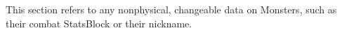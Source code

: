 
This section refers to any nonphysical, changeable data on Monsters, such as their combat StatsBlock or their nickname.


